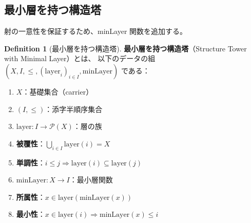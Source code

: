 \documentclass[11pt,a4paper]{article}
\theoremstyle{plain}
\theoremstyle{definition}
\newtheorem{definition}[theorem]{Definition}
\newcommand{\minLayer}{\mathrm{minLayer}}
\newcommand{\layer}{\mathrm{layer}}
\begin{document}
\subsection{最小層を持つ構造塔}

射の一意性を保証するため、minLayer 関数を追加する。

\begin{definition}[最小層を持つ構造塔]
\label{def:structure-tower-min}
\textbf{最小層を持つ構造塔}（Structure Tower with Minimal Layer）とは、
以下のデータの組 $(X, I, \leq, (\layer_i)_{i \in I}, \minLayer)$ である：
\begin{enumerate}[label=(\arabic*)]
  \item $X$：基礎集合（carrier）
  \item $(I, \leq)$：添字半順序集合
  \item $\layer : I \to \mathcal{P}(X)$：層の族
  \item \textbf{被覆性}：$\bigcup_{i \in I} \layer(i) = X$
  \item \textbf{単調性}：$i \leq j \Rightarrow \layer(i) \subseteq \layer(j)$
  \item $\minLayer : X \to I$：最小層関数
  \item \textbf{所属性}：$x \in \layer(\minLayer(x))$
  \item \textbf{最小性}：$x \in \layer(i) \Rightarrow \minLayer(x) \leq i$
\end{enumerate}
\end{definition}
\end{document}
